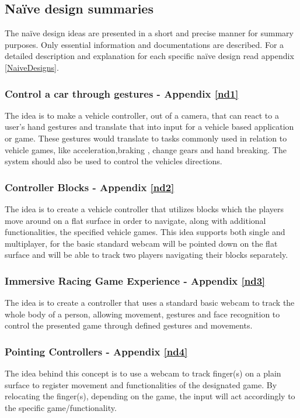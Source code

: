 \subsection{Naïve design summaries}
The naïve design ideas are presented in a short and precise manner for summary purposes. Only essential information and documentations are described. For a detailed description and explanation for each specific naïve design read appendix \ref{NaiveDesigns}. 

\subsubsection{Control a car through gestures - Appendix \ref{nd1}}
 The idea is to make a vehicle controller, out of a camera, that can react to a user’s hand gestures and translate that into input for a vehicle based application or game. These gestures would translate to tasks commonly used in relation to vehicle games, like acceleration,braking , change gears and hand breaking. The system should also be used to control the vehicles directions.

\subsubsection{Controller Blocks - Appendix \ref{nd2}}
The idea is to create a vehicle controller that utilizes blocks which the players move around on a flat surface in order to navigate, along with additional functionalities, the specified vehicle games. This idea supports both single and multiplayer, for the basic standard webcam will be pointed down on the flat surface and will be able to track two players navigating their blocks separately.

\subsubsection{Immersive Racing Game Experience - Appendix \ref{nd3}}
The idea is to create a controller that uses a standard basic webcam to track the whole body of a person, allowing movement, gestures and face recognition to control the presented game through defined gestures and movements.

\subsubsection{Pointing Controllers - Appendix \ref{nd4}}
The idea behind this concept is to use a webcam to track finger(s) on a plain surface to register movement and functionalities of the designated game. By relocating the finger(s), depending on the game, the input will act accordingly to the specific game/functionality.

